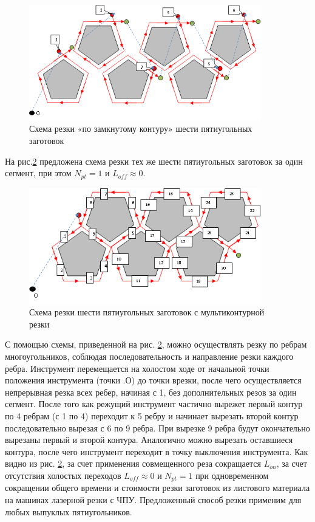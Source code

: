 \documentclass{article}
\begin{document}
\begin{figure}
  \begin{center}
  \includegraphics[width=0.9\textwidth]{5-6.png}
  \caption{Схема резки «по замкнутому контуру» шести пятиугольных заготовок}
  \label{5-6}
  \end{center}
\end{figure}

На рис.\ref{5-1}
предложена схема резки тех же шести
пятиугольных заготовок за один сегмент, при этом  $N_{pt}=1$
и $L_{off} \approx 0$.

\begin{figure}
  \begin{center}
  \includegraphics[width=0.9\textwidth]{5-1.png}
  \caption{Схема резки шести пятиугольных заготовок с мультиконтурной резки}
  \label{5-1}
  \end{center}
\end{figure}

С помощью схемы, приведенной на рис. \ref{5-1},
можно осуществлять резку по ребрам многоугольников,
соблюдая последовательность и направление резки каждого ребра.
Инструмент перемещается на холостом ходе от
начальной точки положения инструмента
(точки .О)
до точки врезки, после чего осуществляется непрерывная резка всех ребер,
начиная с 1, без дополнительных резов за один сегмент.
После того как режущий инструмент частично вырежет
первый контур по 4 ребрам (с 1 по 4)
переходит к 5 ребру и начинает вырезать
второй контур последовательно вырезая с 6 по 9 ребра.
При вырезке 9 ребра будут окончательно
вырезаны первый и второй контура.
Аналогично можно вырезать оставшиеся контура,
после чего инструмент переходит в точку выключения инструмента.
Как видно из рис. \ref{5-1},
за счет применения совмещенного реза сокращается $L_{on}$,
за счет отсутствия холостых переходов
$L_{off} \approx 0$
и $N_{pt}=1$
при одновременном сокращении общего времени
и стоимости резки заготовок из листового
материала на машинах лазерной резки с ЧПУ.
Предложенный способ резки применим для любых выпуклых пятиугольников.
\end{document}
